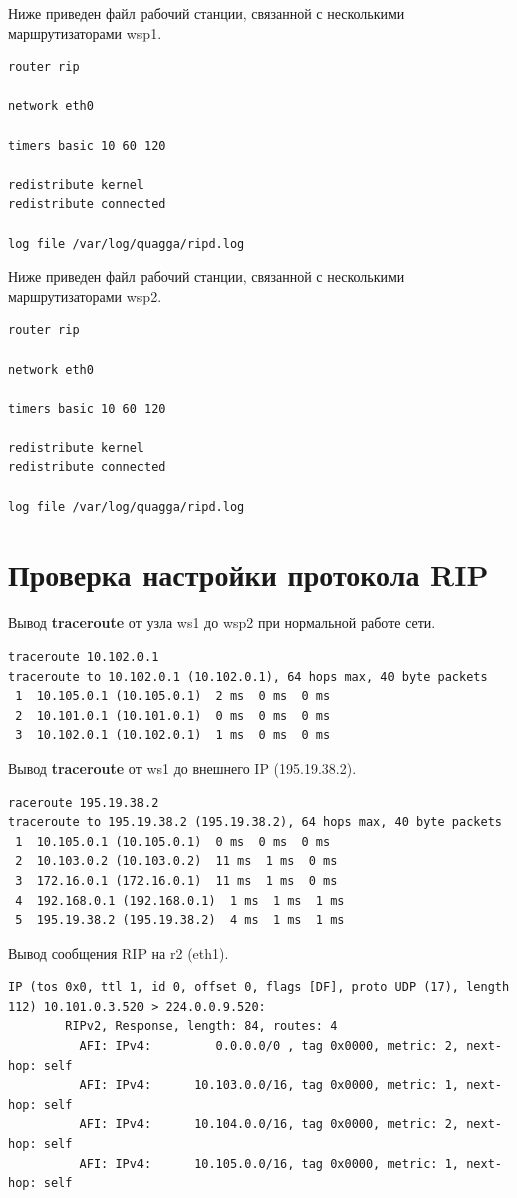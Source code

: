\documentclass[a4paper,12pt]{article}
\begin{document}
Ниже приведен файл  рабочий станции, связанной с несколькими маршрутизаторами wsp1.

\begin{Verbatim}
router rip

network eth0

timers basic 10 60 120

redistribute kernel
redistribute connected

log file /var/log/quagga/ripd.log
\end{Verbatim}

Ниже приведен файл  рабочий станции, связанной с несколькими маршрутизаторами wsp2.

\begin{Verbatim}
router rip

network eth0

timers basic 10 60 120

redistribute kernel
redistribute connected

log file /var/log/quagga/ripd.log
\end{Verbatim}

\section{Проверка настройки протокола RIP}

Вывод \textbf{traceroute} от узла ws1 до wsp2 при нормальной работе сети.

\begin{Verbatim}
traceroute 10.102.0.1
traceroute to 10.102.0.1 (10.102.0.1), 64 hops max, 40 byte packets
 1  10.105.0.1 (10.105.0.1)  2 ms  0 ms  0 ms
 2  10.101.0.1 (10.101.0.1)  0 ms  0 ms  0 ms
 3  10.102.0.1 (10.102.0.1)  1 ms  0 ms  0 ms
\end{Verbatim}

Вывод \textbf{traceroute} от ws1 до внешнего IP (195.19.38.2).

\begin{Verbatim}
raceroute 195.19.38.2
traceroute to 195.19.38.2 (195.19.38.2), 64 hops max, 40 byte packets
 1  10.105.0.1 (10.105.0.1)  0 ms  0 ms  0 ms
 2  10.103.0.2 (10.103.0.2)  11 ms  1 ms  0 ms
 3  172.16.0.1 (172.16.0.1)  11 ms  1 ms  0 ms
 4  192.168.0.1 (192.168.0.1)  1 ms  1 ms  1 ms
 5  195.19.38.2 (195.19.38.2)  4 ms  1 ms  1 ms
\end{Verbatim}

Вывод сообщения RIP на r2 (eth1).

\begin{Verbatim}
IP (tos 0x0, ttl 1, id 0, offset 0, flags [DF], proto UDP (17), length 112) 10.101.0.3.520 > 224.0.0.9.520: 
        RIPv2, Response, length: 84, routes: 4
          AFI: IPv4:         0.0.0.0/0 , tag 0x0000, metric: 2, next-hop: self
          AFI: IPv4:      10.103.0.0/16, tag 0x0000, metric: 1, next-hop: self
          AFI: IPv4:      10.104.0.0/16, tag 0x0000, metric: 2, next-hop: self
          AFI: IPv4:      10.105.0.0/16, tag 0x0000, metric: 1, next-hop: self
\end{Verbatim}
\end{document}
